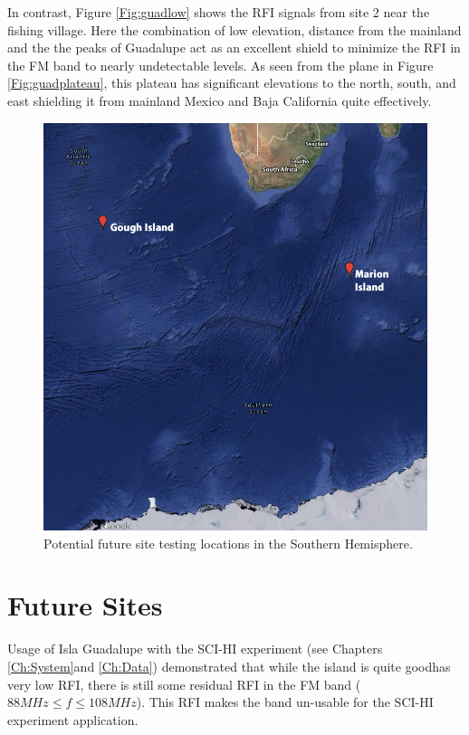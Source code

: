 In contrast, Figure \ref{Fig:guadlow} shows the RFI signals from site 2 near the fishing village. Here the combination of low elevation, distance from the mainland and the the peaks of Guadalupe act as an excellent shield to minimize the RFI in the FM band to nearly undetectable levels. As seen from the plane in Figure \ref{Fig:guadplateau}, this plateau has significant elevations to the north, south, and east shielding it from mainland Mexico and Baja California quite effectively. 

\begin{figure}[htb]
\begin{center}
\includegraphics[width=0.9\linewidth]{RFI_testing/figures/site_testing_south.jpg}
\caption{Potential future site testing locations in the Southern Hemisphere.}
\label{Fig:site_map_south}
\end{center}
\end{figure}

\section{Future Sites}
Usage of Isla Guadalupe with the SCI-HI experiment (see Chapters \ref{Ch:System}and \ref{Ch:Data}) demonstrated that while the island is quite goodhas very low RFI, there is still some residual RFI in the FM band ($88 MHz \leq f \leq 108 MHz$). This RFI makes the band un-usable for the SCI-HI experiment application. 

